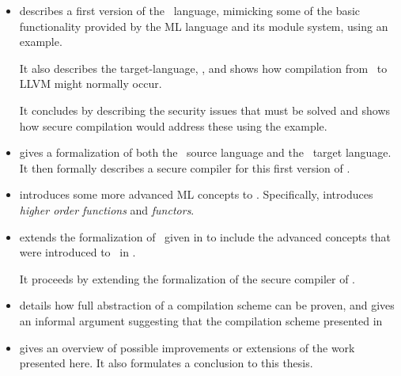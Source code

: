 \begin{itemize}
\item 
{} describes a first version of the \MiniML\ language, mimicking some of the basic functionality provided by the ML language and its module system, using an example.

It also describes the target-language, \LLVMIR, and shows how compilation from \MiniML\ to LLVM might normally occur.

It concludes by describing the security issues that must be solved and shows how secure compilation would address these using the example.

\item
{} gives a formalization of both the \MiniML\ source language and the \LLVMIR\ target language.
It then formally describes a secure compiler for this first version of \MiniML.

\item
{} introduces some more advanced ML concepts to \MiniML.
Specifically, introduces \emph{higher order functions} and \emph{functors}.

\item
{} extends the formalization of \MiniML\ given in  to include the advanced concepts that were introduced to \MiniML\ in .

It proceeds by extending the formalization of the secure compiler of .

\item
{} details how full abstraction of a compilation scheme can be proven, and gives an informal argument suggesting that the compilation scheme presented in 

\item
{} gives an overview of possible improvements or extensions of the work presented here.
It also formulates a conclusion to this thesis.
\end{itemize}
